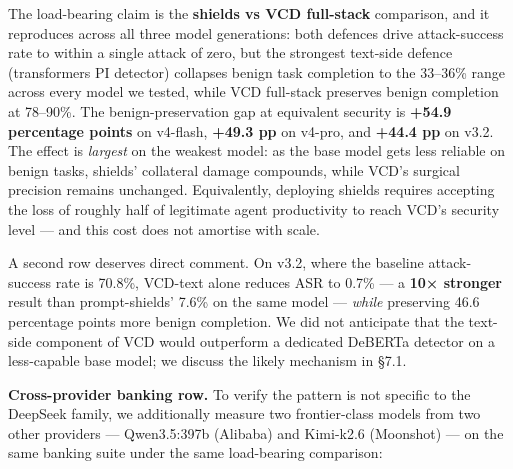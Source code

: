The load-bearing claim is the \textbf{shields vs VCD full-stack}
comparison, and it reproduces across all three model generations: both
defences drive attack-success rate to within a single attack of zero,
but the strongest text-side defence (transformers PI detector) collapses
benign task completion to the 33--36\% range across every model we
tested, while VCD full-stack preserves benign completion at 78--90\%.
The benign-preservation gap at equivalent security is \textbf{+54.9
percentage points} on v4-flash, \textbf{+49.3 pp} on v4-pro, and
\textbf{+44.4 pp} on v3.2. The effect is \emph{largest} on the weakest
model: as the base model gets less reliable on benign tasks, shields'
collateral damage compounds, while VCD's surgical precision remains
unchanged. Equivalently, deploying shields requires accepting the loss
of roughly half of legitimate agent productivity to reach VCD's security
level --- and this cost does not amortise with scale.

A second row deserves direct comment. On v3.2, where the baseline
attack-success rate is 70.8\%, VCD-text alone reduces ASR to 0.7\% --- a
\textbf{10× stronger} result than prompt-shields' 7.6\% on the same
model --- \emph{while} preserving 46.6 percentage points more benign
completion. We did not anticipate that the text-side component of VCD
would outperform a dedicated DeBERTa detector on a less-capable base
model; we discuss the likely mechanism in §7.1.

\textbf{Cross-provider banking row.} To verify the pattern is not
specific to the DeepSeek family, we additionally measure two
frontier-class models from two other providers --- Qwen3.5:397b
(Alibaba) and Kimi-k2.6 (Moonshot) --- on the same banking suite under
the same load-bearing comparison:

